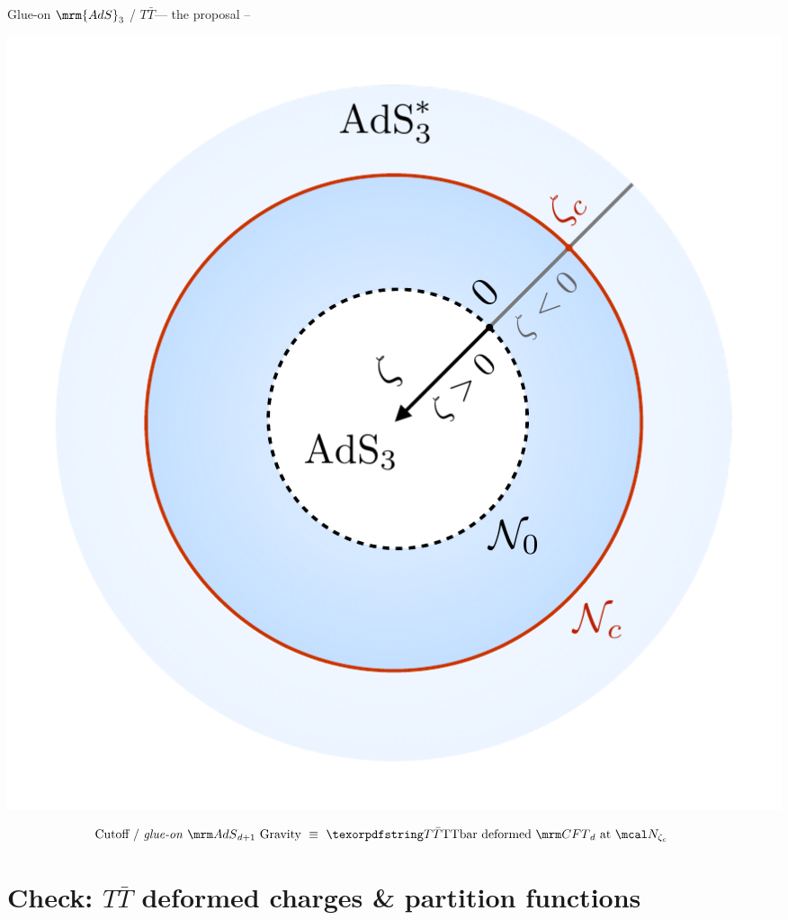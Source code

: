 \documentclass[
	10pt
	,handout
	,noamsthm
]{beamer}
\newcommand{\TTbar}{\texorpdfstring{\ensuremath{T\bar{T}}}{TTbar}\xspace}
\begin{document}
\begin{frame}{Glue-on $\mrm{AdS}_3$ / \TTbar --- the proposal}{%
	\textcite{Apolo:2023vnm} -- 
}
\centering
\vspace{-.5\baselineskip}
\begin{minipage}{.5\textwidth}
\centering
\includegraphics[width=.8\linewidth]{img/diagram.pdf}
\end{minipage}
\vspace{-.8\baselineskip}
\begin{equation}
\stateGlueon
\end{equation}
\end{frame}

\section{\textbf{Check:} \TTbar deformed charges \& partition functions} \label{se:charges}
\end{document}
